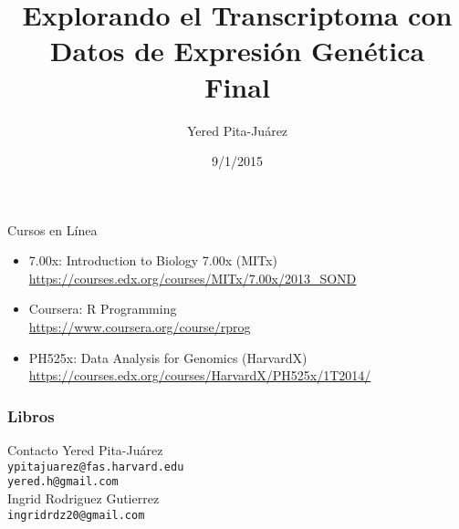 \documentclass{beamer}
\begin{document}
\title[Final]{Explorando el Transcriptoma con Datos de Expresi\'{o}n Gen\'{e}tica\\
\vspace{0.5cm}
Final}
\author{Yered Pita-Ju\'{a}rez}
\date{9/1/2015}


\begin{frame}
\titlepage
\end{frame}

\begin{frame}{Cursos en Línea}
\begin{itemize}
\item 7.00x: Introduction to Biology 7.00x (MITx)\\
\url{https://courses.edx.org/courses/MITx/7.00x/2013_SOND}
\item Coursera: R Programming\\
\url{https://www.coursera.org/course/rprog}
\item PH525x: Data Analysis for Genomics (HarvardX)\\
\url{https://courses.edx.org/courses/HarvardX/PH525x/1T2014/}
\end{itemize}
\end{frame}
\nocite{*}

\begin{frame}[allowframebreaks]
\frametitle{Libros}
\small


\end{frame}

\begin{frame}{Contacto}
Yered Pita-Juárez\\
\texttt{ypitajuarez@fas.harvard.edu}\\
\texttt{yered.h@gmail.com}\\
\vspace{1cm}
Ingrid Rodriguez Gutierrez\\
\texttt{ingridrdz20@gmail.com}
\end{frame}
\end{document}
